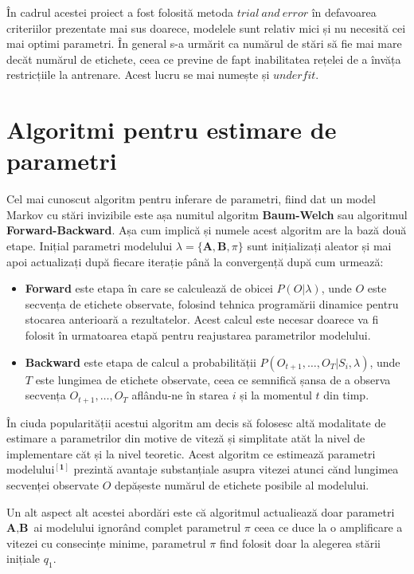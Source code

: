 În cadrul acestei proiect a fost folosită metoda $trial\ and\ error$ în defavoarea criteriilor prezentate mai sus doarece, modelele sunt relativ mici și nu necesită cei mai optimi parametri. În general s-a urmărit ca numărul de stări să fie mai mare decăt numărul de etichete, ceea ce previne de fapt inabilitatea rețelei de a învăța restricțiile la antrenare. Acest lucru se mai numește și $underfit$.\par

\section{Algoritmi pentru estimare de parametri}

Cel mai cunoscut algoritm pentru inferare de parametri, fiind dat un model Markov cu stări invizibile este așa numitul algoritm \textbf{Baum-Welch} sau algoritmul \textbf{Forward-Backward}. Așa cum implică și numele acest algoritm are la bază două etape. Inițial parametri modelului $\lambda = \{\textbf{A},\textbf{B},\pi\}$ sunt inițializați aleator și mai apoi actualizați după fiecare iterație până la convergență după cum urmează:
\begin{itemize}
\item{\textbf{Forward} este etapa în care se calculează de obicei $P(O|\lambda)$, unde $O$ este secvența de etichete observate, folosind tehnica programării dinamice pentru stocarea anterioară a rezultatelor. Acest calcul este necesar doarece va fi folosit în urmatoarea etapă pentru reajustarea parametrilor modelului.}
\item{\textbf{Backward} este etapa de calcul a probabilității $P(O_{t+1},\dots,O_{T}| S_{i},\lambda)$, unde $T$ este lungimea de etichete observate, ceea ce semnifică șansa de a observa secvența $O_{t+1},\dots,O_{T}$ aflându-ne în starea $i$ și la momentul $t$ din timp}.
\end{itemize}
\par

În ciuda popularității acestui algoritm am decis să folosesc altă modalitate de estimare a parametrilor din motive de viteză și simplitate atăt la nivel de implementare căt și la nivel teoretic. Acest algoritm ce estimează parametri modelului$^{\mathbf{[1]}}$ prezintă avantaje substanțiale asupra vitezei atunci cănd lungimea secvenței observate $O$ depășeste numărul de etichete posibile al modelului.\par

Un alt aspect alt acestei abordări este că algoritmul actualiează doar parametri $\textbf{A},\textbf{B}$ ai modelului ignorând complet parametrul $\pi$ ceea ce duce la o amplificare a vitezei cu consecințe minime, parametrul $\pi$ find folosit doar la alegerea stării inițiale $q_{1}$.\par

